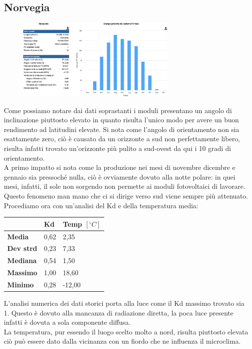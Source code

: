 \subsection{Norvegia}
\begin{figure}[H]
    \centering
    \includegraphics[width=0.7\textwidth]{res/cap 5/impianto norvegia}
\end{figure}\noindent
Come possiamo notare dai dati soprastanti i moduli presentano un angolo di inclinazione piuttosto elevato in quanto risulta l'unico modo per avere un buon rendimento ad latitudini elevate. Si nota come l'angolo di orientamento non sia esattamente zero, ciò è causato da un orizzonte a sud non perfettamente libero, risulta infatti trovato un'orizzonte più pulito a sud-ovest da qui i 10 gradi di orientamento.\\
A primo impatto si nota come la produzione nei mesi di novembre dicembre e gennaio sia pressoché nulla, ciò è ovviamente dovuto alla notte polare: in quei mesi, infatti, il sole non sorgendo non permette ai moduli fotovoltaici di lavorare. Questo fenomeno man mano che ci si dirige verso sud viene sempre più attenuato.
Procediamo ora con un'analisi del Kd e della temperatura media:
\begin{table}[H]
    \centering
    \begin{tabular}{|l|l|l|}
    \hline
         & \textbf{Kd} & \textbf{Temp $[{}^\circ C]$} \\ \hline
        \textbf{Media} & 0,62 & 2,35 \\ \hline
        \textbf{Dev strd} & 0,23 & 7,33 \\ \hline
        \textbf{Mediana} & 0,54 & 1,50 \\ \hline
        \textbf{Massimo} & 1,00 & 18,60 \\ \hline
        \textbf{Minimo}  & 0,28 & -12,00 \\ \hline
    \end{tabular}
\end{table}\noindent
L'analisi numerica dei dati storici porta alla luce come il Kd massimo trovato sia 1. Questo è dovuto alla mancanza di radiazione diretta, la poca luce presente infatti è dovuta a sola componente diffusa.\\
La temperatura, pur essendo il luogo scelto molto a nord, risulta piuttosto elevata ciò può essere dato dalla vicinanza con un fiordo che ne influenza il microclima.
\vfill\newpage
